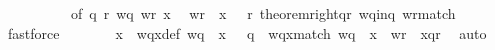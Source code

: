 \begin{isabellebody}
\ \ \ \ \ \ \ \ \ \ of\ q\ r\ wq\ wr{\isacharprime}{\kern0pt}\ x{\isacharprime}{\kern0pt}{\isacharbrackright}{\kern0pt}\ \isamarkupfalse%
\ {\isacartoucheopen}wr{\isacharprime}{\kern0pt}\ {\isasymsqdot}\ x{\isacharprime}{\kern0pt}\ {\isasymin}\ {\isasymL}\isactrlsup {\isacharasterisk}{\kern0pt}\ r{\isacartoucheclose}\ theorem{\isacharunderscore}{\kern0pt}right{\isacharunderscore}{\kern0pt}qr\ wq{\isacharunderscore}{\kern0pt}in{\isacharunderscore}{\kern0pt}q\ wr{\isacharprime}{\kern0pt}{\isacharunderscore}{\kern0pt}match\ \isamarkupfalse%
\ fastforce\isanewline
\ \ \ \ \isamarkupfalse%
\ \isamarkupfalse%
\ x\ \ wqx{\isacharunderscore}{\kern0pt}def{\isacharcolon}{\kern0pt}\ {\isachardoublequoteopen}{\isacharparenleft}{\kern0pt}wq\ {\isasymsqdot}\ x{\isacharparenright}{\kern0pt}\ {\isasymin}\ {\isasymL}\isactrlsup {\isacharasterisk}{\kern0pt}\ q{\isachardoublequoteclose}\ \ wqx{\isacharunderscore}{\kern0pt}match{\isacharcolon}{\kern0pt}\ {\isachardoublequoteopen}{\isacharparenleft}{\kern0pt}{\isacharparenleft}{\kern0pt}{\isacharparenleft}{\kern0pt}wq\ {\isasymsqdot}\ x{\isacharparenright}{\kern0pt}{\isasymdown}\isactrlsub {\isacharquery}{\kern0pt}{\isacharparenright}{\kern0pt}{\isasymdown}\isactrlsub {\isacharbang}{\kern0pt}\isactrlsub {\isacharquery}{\kern0pt}{\isacharparenright}{\kern0pt}\ {\isacharequal}{\kern0pt}\ {\isacharparenleft}{\kern0pt}{\isacharparenleft}{\kern0pt}{\isacharparenleft}{\kern0pt}{\isacharparenleft}{\kern0pt}wr{\isacharprime}{\kern0pt}\ {\isasymsqdot}\ x{\isacharprime}{\kern0pt}{\isacharparenright}{\kern0pt}{\isasymdown}\isactrlsub {\isacharbang}{\kern0pt}{\isacharparenright}{\kern0pt}{\isasymdown}\isactrlsub {\isacharbraceleft}{\kern0pt}\isactrlsub q\isactrlsub {\isacharcomma}{\kern0pt}\isactrlsub r\isactrlsub {\isacharbraceright}{\kern0pt}{\isacharparenright}{\kern0pt}{\isasymdown}\isactrlsub {\isacharbang}{\kern0pt}\isactrlsub {\isacharquery}{\kern0pt}{\isacharparenright}{\kern0pt}{\isachardoublequoteclose}\ \isamarkupfalse%
\ auto\isanewline
\ \ \ \ \isamarkupfalse%
\ \isamarkupfalse%

\end{isabellebody}
